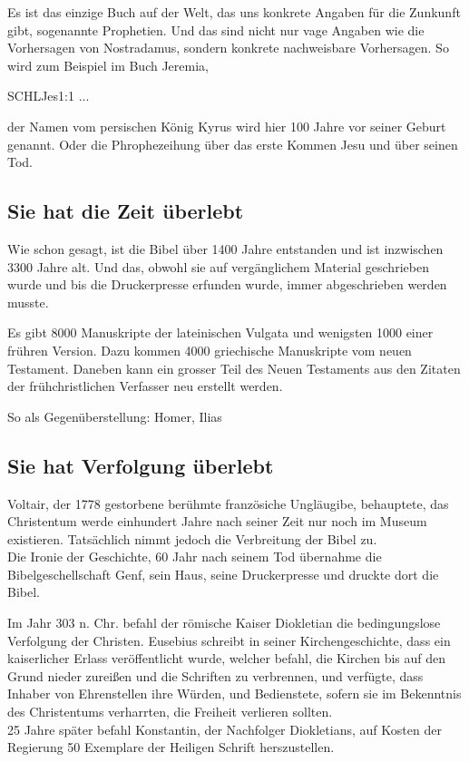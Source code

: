 Es ist das einzige Buch auf der Welt, das uns konkrete Angaben für die Zunkunft gibt, sogenannte Prophetien. Und das sind nicht nur vage Angaben wie die Vorhersagen von Nostradamus, sondern konkrete nachweisbare Vorhersagen. So wird zum Beispiel im Buch Jeremia, 
\begin{bibelbox}{SCHL}{Jes}{1:1}
    ...
\end{bibelbox}
der Namen vom persischen König Kyrus wird hier 100 Jahre vor seiner Geburt genannt. Oder die Phrophezeihung über das erste Kommen Jesu und über seinen Tod. 

\subsection{Sie hat die Zeit überlebt}
Wie schon gesagt, ist die Bibel über 1400 Jahre entstanden und ist inzwischen 3300 Jahre alt. Und das, obwohl sie auf vergänglichem Material geschrieben wurde und bis die Druckerpresse erfunden wurde, immer abgeschrieben werden musste.

Es gibt 8000 Manuskripte der lateinischen Vulgata und wenigsten 1000 einer frühren Version. Dazu kommen 4000 griechische Manuskripte vom neuen Testament. Daneben kann ein grosser Teil des Neuen Testaments aus den Zitaten der frühchristlichen Verfasser neu erstellt werden.

So als Gegenüberstellung: Homer, Ilias 

\subsection{Sie hat Verfolgung überlebt}

Voltair, der 1778 gestorbene berühmte französiche Ungläugibe, behauptete, das Christentum werde einhundert Jahre nach seiner Zeit nur noch im Museum existieren. Tatsächlich nimmt jedoch die Verbreitung der Bibel zu.\\
Die Ironie der Geschichte, 60 Jahr nach seinem Tod übernahme die Bibelgeschellschaft Genf, sein Haus, seine Druckerpresse und druckte dort die Bibel.

Im Jahr 303 n. Chr. befahl der römische Kaiser Diokletian die bedingungslose Verfolgung der Christen. Eusebius schreibt in seiner Kirchengeschichte, dass ein kaiserlicher Erlass veröffentlicht wurde, welcher befahl, die Kirchen bis auf den Grund nieder zureißen und die Schriften zu verbrennen, und verfügte, dass Inhaber von
Ehrenstellen ihre Würden, und Bedienstete, sofern sie im Bekenntnis des Christentums verharrten, die Freiheit verlieren sollten.\\
25 Jahre später befahl Konstantin, der Nachfolger Diokletians, auf Kosten der Regierung 50 Exemplare der Heiligen Schrift herszustellen.

